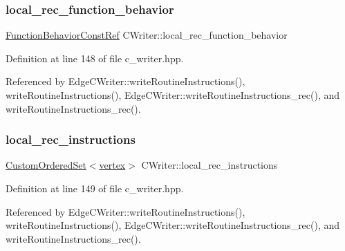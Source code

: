 \subsubsection{\texorpdfstring{local\+\_\+rec\+\_\+function\+\_\+behavior}{local\_rec\_function\_behavior}}
{\footnotesize\ttfamily \hyperlink{function__behavior_8hpp_a94872da12ed056b6ecf90456164e0213}{Function\+Behavior\+Const\+Ref} C\+Writer\+::local\+\_\+rec\+\_\+function\+\_\+behavior\hspace{0.3cm}{\ttfamily [protected]}}



Definition at line 148 of file c\+\_\+writer.\+hpp.



Referenced by Edge\+C\+Writer\+::write\+Routine\+Instructions(), write\+Routine\+Instructions(), Edge\+C\+Writer\+::write\+Routine\+Instructions\+\_\+rec(), and write\+Routine\+Instructions\+\_\+rec().

\mbox{\label{classCWriter_a369957abf1562ef733d60ba5795b1aaf}} 
\subsubsection{\texorpdfstring{local\+\_\+rec\+\_\+instructions}{local\_rec\_instructions}}
{\footnotesize\ttfamily \hyperlink{classCustomOrderedSet}{Custom\+Ordered\+Set}$<$\hyperlink{graph_8hpp_abefdcf0544e601805af44eca032cca14}{vertex}$>$ C\+Writer\+::local\+\_\+rec\+\_\+instructions\hspace{0.3cm}{\ttfamily [protected]}}



Definition at line 149 of file c\+\_\+writer.\+hpp.



Referenced by Edge\+C\+Writer\+::write\+Routine\+Instructions(), write\+Routine\+Instructions(), Edge\+C\+Writer\+::write\+Routine\+Instructions\+\_\+rec(), and write\+Routine\+Instructions\+\_\+rec().

\mbox{\label{classCWriter_af80f335f9f823a734687d9b086f4494d}} 

